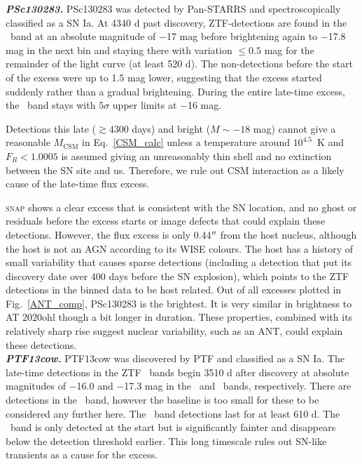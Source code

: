 \documentclass[a4paper,oneside,12pt, class=Latex/Classes/PhDthesisPSnPDF, crop=false]{standalone}
\begin{document}
\textit{\textbf{PSc130283.}}
PSc130283 was detected by Pan-STARRS and spectroscopically classified as a SN Ia. At 4340 d past discovery, ZTF-detections are found in the \ztfr\ band at an absolute magnitude of $-$17 mag before brightening again to $-$17.8 mag in the next bin and staying there with variation $\leq 0.5$ mag for the remainder of the light curve (at least 520 d). The non-detections before the start of the excess were up to 1.5 mag lower, suggesting that the excess started suddenly rather than a gradual brightening. During the entire late-time excess, the \ztfg\ band stays with $5\sigma$ upper limits at $-$16 mag.

Detections this late ($\gtrsim 4300$ days) and bright ($M \sim -18$ mag) cannot give a reasonable $M_\text{CSM}$ in Eq.~\ref{CSM_calc} unless a temperature around $10^{4.5}$~K and $F_R < 1.0005$ is assumed giving an unreasonably thin shell and no extinction between the SN site and us. Therefore, we rule out CSM interaction as a likely cause of the late-time flux excess.

\textsc{snap} shows a clear excess that is consistent with the SN location, and no ghost or residuals before the excess starts  or image defects that could explain these detections. However, the flux excess is only 0.44$^{\prime\prime}$ from the host nucleus, although the host is not an AGN according to its WISE colours. The host has a history of small variability that causes sparse detections (including a detection that put its discovery date over 400 days before the SN explosion), which points to the ZTF detections in the binned data to be host related. Out of all excesses plotted in Fig.~\ref{ANT_comp}, PSc130283 is the brightest. It is very similar in brightness to AT 2020ohl though a bit longer in duration. These properties, combined with its relatively sharp rise suggest nuclear variability, such as an ANT, could explain these detections.\\


\textit{\textbf{PTF13cow.}}
PTF13cow was discovered by PTF and classified as a SN Ia. The late-time detections in the ZTF \ztfg\ztfr\ztfi\ bands begin 3510 d after discovery at absolute magnitudes of $-$16.0 and $-$17.3 mag in the \ztfg\ and \ztfr\ bands, respectively. There are detections in the \ztfi\ band, however the baseline is too small for these to be considered any further here. The \ztfr\ band detections last for at least 610 d. The \ztfg\ band is only detected at the start but is significantly fainter and disappears below the detection threshold earlier. This long timescale rules out SN-like transients as a cause for the excess.
\end{document}
